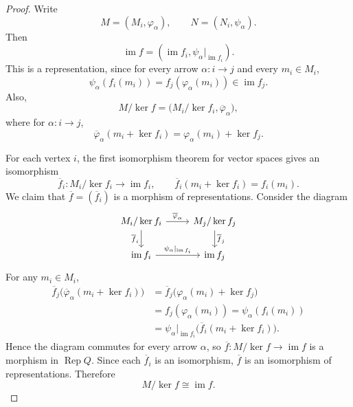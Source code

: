 \documentclass[11pt, a4paper]{report}
\begin{document}
\begin{proof}
    Write
    \[
        M=(M_i,\varphi_\alpha), \qquad N=(N_i,\psi_\alpha).
    \]
    Then
    \[
        \operatorname{im}f=(\operatorname{im}f_i,\psi_\alpha|_{\operatorname{im}f_i}).
    \]
    This is a representation, since for every arrow $\alpha:i\to j$ and every $m_i\in M_i$,
    \[
        \psi_\alpha(f_i(m_i))=f_j(\varphi_\alpha(m_i))\in \operatorname{im}f_j.
    \]
    Also,
    \[
        M/\operatorname{ker}f=\bigl(M_i/\operatorname{ker}f_i,\overline{\varphi}_\alpha\bigr),
    \]
    where for $\alpha:i\to j$,
    \[
        \overline{\varphi}_\alpha(m_i+\operatorname{ker}f_i)=\varphi_\alpha(m_i)+\operatorname{ker}f_j.
    \]

    For each vertex $i$, the first isomorphism theorem for vector spaces gives an isomorphism
    \[
        \overline{f}_i:M_i/\operatorname{ker}f_i\longrightarrow \operatorname{im}f_i,
        \qquad
        \overline{f}_i(m_i+\operatorname{ker}f_i)=f_i(m_i).
    \]
    We claim that $\overline{f}=(\overline{f}_i)$ is a morphism of representations. Consider the diagram
    \[
        \begin{tikzcd}
            M_i/\operatorname{ker}f_i \arrow[r, "\overline{\varphi}_\alpha"] \arrow[d, "\overline{f}_i"'] & M_j/\operatorname{ker}f_j \arrow[d, "\overline{f}_j"] \\
            \operatorname{im}f_i \arrow[r, "\psi_\alpha|_{\operatorname{im}f_i}"] & \operatorname{im}f_j
        \end{tikzcd}
    \]
    For any $m_i\in M_i$,
    \begin{align*}
        \overline{f}_j\bigl(\overline{\varphi}_\alpha(m_i+\operatorname{ker}f_i)\bigr)
         & =\overline{f}_j\bigl(\varphi_\alpha(m_i)+\operatorname{ker}f_j\bigr)                       \\
         & =f_j(\varphi_\alpha(m_i))
        =\psi_\alpha(f_i(m_i))                                                                        \\
         & =\psi_\alpha|_{\operatorname{im}f_i}\bigl(\overline{f}_i(m_i+\operatorname{ker}f_i)\bigr).
    \end{align*}
    Hence the diagram commutes for every arrow $\alpha$, so $\overline{f}:M/\operatorname{ker}f\to \operatorname{im}f$ is a morphism in $\operatorname{Rep}Q$. Since each $\overline{f}_i$ is an isomorphism, $\overline{f}$ is an isomorphism of representations.
    Therefore
    \[
        M/\operatorname{ker}f\cong \operatorname{im}f.
    \]
\end{proof}
\end{document}
